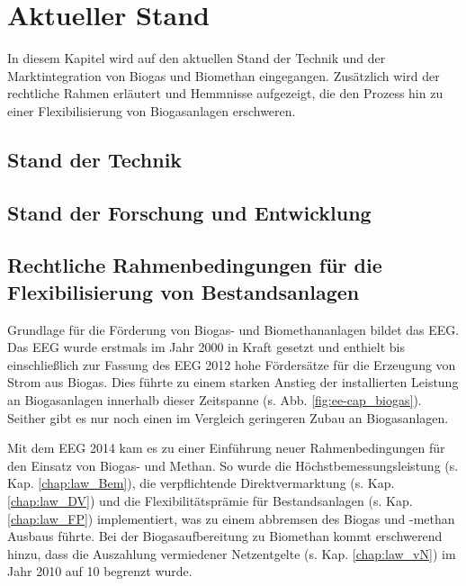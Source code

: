 \section{Aktueller Stand}

In diesem Kapitel wird auf den aktuellen Stand der Technik und der Marktintegration von Biogas und Biomethan eingegangen. Zusätzlich wird der rechtliche Rahmen erläutert und Hemmnisse aufgezeigt, die den Prozess hin zu einer Flexibilisierung von Biogasanlagen erschweren.


\subsection{Stand der Technik}



\subsection{Stand der Forschung und Entwicklung}


\subsection{Rechtliche Rahmenbedingungen für die Flexibilisierung von Bestandsanlagen}\label{chap:law_theo}

Grundlage für die Förderung von Biogas- und Biomethananlagen bildet das \gls{EEG}. Das \gls{EEG} wurde erstmals im Jahr 2000 in Kraft gesetzt und enthielt bis einschließlich zur Fassung des \gls{EEG} \SI{2012}{\relax} hohe Fördersätze für die Erzeugung von Strom aus Biogas. Dies führte zu einem starken Anstieg der installierten Leistung an Biogasanlagen innerhalb dieser Zeitspanne (s. Abb. \ref{fig:ee-cap_biogas}). Seither gibt es nur noch einen im Vergleich geringeren Zubau an Biogasanlagen. \parencite{DanielGromke2019}\smallskip

Mit dem \gls{EEG} \SI{2014}{\relax} kam es zu einer Einführung neuer Rahmenbedingungen für den Einsatz von Biogas- und Methan. So wurde die Höchstbemessungsleistung (s. Kap. \ref{chap:law_Bem}), die verpflichtende Direktvermarktung (s. Kap. \ref{chap:law_DV}) und die Flexibilitätsprämie für Bestandsanlagen (s. Kap. \ref{chap:law_FP}) implementiert, was zu einem abbremsen des Biogas und -methan Ausbaus führte. Bei der Biogasaufbereitung zu Biomethan kommt erschwerend hinzu, dass die Auszahlung vermiedener Netzentgelte (s. Kap. \ref{chap:law_vN}) im Jahr \SI{2010}{\relax} auf \SI{10}{\Jahre} begrenzt wurde. \parencite{BDEW2019a}


